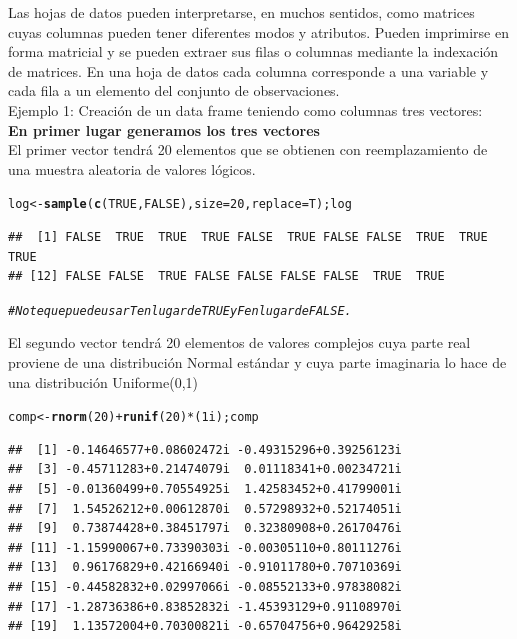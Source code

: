 \documentclass[12pt,letterpaper]{article}\usepackage[]{graphicx}\usepackage[]{color}
\makeatletter
\newcommand{\hlnum}[1]{\textcolor[rgb]{0.686,0.059,0.569}{#1}}%
\newcommand{\hlcom}[1]{\textcolor[rgb]{0.678,0.584,0.686}{\textit{#1}}}%
\newcommand{\hlopt}[1]{\textcolor[rgb]{0,0,0}{#1}}%
\newcommand{\hlstd}[1]{\textcolor[rgb]{0.345,0.345,0.345}{#1}}%
\newcommand{\hlkwb}[1]{\textcolor[rgb]{0.69,0.353,0.396}{#1}}%
\newcommand{\hlkwc}[1]{\textcolor[rgb]{0.333,0.667,0.333}{#1}}%
\newcommand{\hlkwd}[1]{\textcolor[rgb]{0.737,0.353,0.396}{\textbf{#1}}}%
\newenvironment{kframe}{%
 \def\at@end@of@kframe{}%
 \ifinner\ifhmode%
  \def\at@end@of@kframe{\end{minipage}}%
  \begin{minipage}{\columnwidth}%
 \fi\fi%
 \def\FrameCommand##1{\hskip\@totalleftmargin \hskip-\fboxsep
 \colorbox{shadecolor}{##1}\hskip-\fboxsep
     \hskip-\linewidth \hskip-\@totalleftmargin \hskip\columnwidth}%
 \MakeFramed {\advance\hsize-\width
   \@totalleftmargin\z@ \linewidth\hsize
   \@setminipage}}%
 {\par\unskip\endMakeFramed%
 \at@end@of@kframe}
\newenvironment{knitrout}{}{} %
\makeatother
\begin{document}
Las hojas de datos pueden interpretarse, en muchos sentidos, como matrices cuyas columnas pueden tener diferentes modos y atributos. Pueden imprimirse en forma matricial y se pueden extraer sus filas o columnas mediante la indexaci\'on de matrices. En una hoja de datos cada columna corresponde a una variable y cada fila a un elemento del conjunto de observaciones.\\

Ejemplo 1: Creaci\'on de un data frame teniendo como columnas tres vectores:\\

\textbf{En primer lugar generamos los tres vectores}\\

El primer vector tendr\'a 20 elementos que se obtienen con reemplazamiento de una muestra aleatoria de valores l\'ogicos.
\begin{knitrout}
\color{fgcolor}\begin{kframe}
\begin{alltt}
\hlstd{log} \hlkwb{<-} \hlkwd{sample}\hlstd{(}\hlkwd{c}\hlstd{(}\hlnum{TRUE}\hlstd{,} \hlnum{FALSE}\hlstd{),} \hlkwc{size} \hlstd{=} \hlnum{20}\hlstd{,} \hlkwc{replace} \hlstd{= T); log}
\end{alltt}
\begin{verbatim}
##  [1] FALSE  TRUE  TRUE  TRUE FALSE  TRUE FALSE FALSE  TRUE  TRUE  TRUE
## [12] FALSE FALSE  TRUE FALSE FALSE FALSE FALSE  TRUE  TRUE
\end{verbatim}
\begin{alltt}
\hlcom{# Note que puede usar T en lugar de TRUE y F en lugar de FALSE. }
\end{alltt}
\end{kframe}
\end{knitrout}

El segundo vector tendr\'a 20 elementos de valores complejos cuya parte real proviene de una distribuci\'on Normal est\'andar y cuya parte imaginaria lo hace de una distribuci\'on Uniforme(0,1)
\begin{knitrout}
\color{fgcolor}\begin{kframe}
\begin{alltt}
\hlstd{comp} \hlkwb{<-} \hlkwd{rnorm}\hlstd{(}\hlnum{20}\hlstd{)} \hlopt{+} \hlkwd{runif}\hlstd{(}\hlnum{20}\hlstd{)} \hlopt{*} \hlstd{(}\hlnum{1i}\hlstd{); comp}
\end{alltt}
\begin{verbatim}
##  [1] -0.14646577+0.08602472i -0.49315296+0.39256123i
##  [3] -0.45711283+0.21474079i  0.01118341+0.00234721i
##  [5] -0.01360499+0.70554925i  1.42583452+0.41799001i
##  [7]  1.54526212+0.00612870i  0.57298932+0.52174051i
##  [9]  0.73874428+0.38451797i  0.32380908+0.26170476i
## [11] -1.15990067+0.73390303i -0.00305110+0.80111276i
## [13]  0.96176829+0.42166940i -0.91011780+0.70710369i
## [15] -0.44582832+0.02997066i -0.08552133+0.97838082i
## [17] -1.28736386+0.83852832i -1.45393129+0.91108970i
## [19]  1.13572004+0.70300821i -0.65704756+0.96429258i
\end{verbatim}
\end{kframe}
\end{knitrout}
\end{document}
